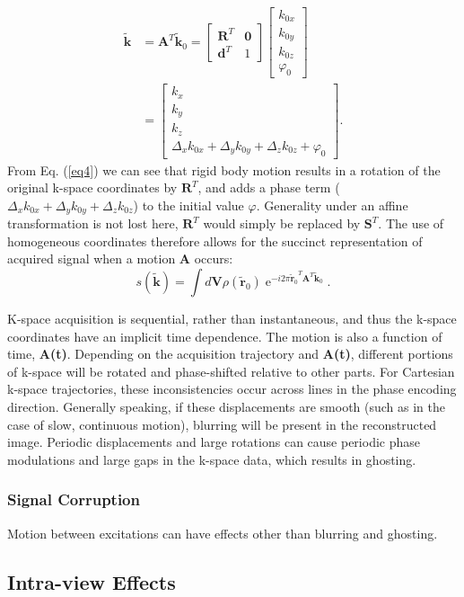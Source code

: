 \documentclass[class=article, crop=false]{standalone}
\begin{document}
\begin{equation} \label{eq4}
	\begin{split}
		\tilde{\textbf{k}} & = \textbf{A}^T\tilde{\textbf{k}}_0
		= \begin{bmatrix}\textbf{R}^T & \textbf{0} \\ \textbf{d}^T & 1\end{bmatrix}\begin{bmatrix}k_{0x}\\k_{0y}\\k_{0z}\\\varphi_0\end{bmatrix}\\
		& = \begin{bmatrix}k_{x}\\k_{y}\\k_{z}\\\Delta_{x}k_{0x} + \Delta_{y}k_{0y} + \Delta_{z}k_{0z} + \varphi_0\end{bmatrix}.
	\end{split}
\end{equation}
From Eq. (\ref{eq4}) we can see that rigid body motion results in a rotation of the original k-space coordinates by $\textbf{R}^T$, and adds a phase term ($\Delta_{x}k_{0x} + \Delta_{y}k_{0y} + \Delta_{z}k_{0z}$) to the initial value $\varphi$. Generality under an affine transformation is not lost here, $\textbf{R}^T$ would simply be replaced by $\textbf{S}^T$. The use of homogeneous coordinates therefore allows for the succinct representation of acquired signal when a motion \textbf{A} occurs:
\begin{equation} \label{eq5}
s(\tilde{\textbf{k}}) = \int d\textbf{V} \rho\left(\tilde{\textbf{r}}_0\right)\operatorname{e}^{-i2\pi{\tilde{\textbf{r}}_0}^{T}\textbf{A}^T\tilde{\textbf{k}}_0}.
\end{equation}
\par
K-space acquisition is sequential, rather than instantaneous, and thus the k-space coordinates have an implicit time dependence. The motion is also a function of time, \textbf{A(t)}. Depending on the acquisition trajectory and \textbf{A(t)}, different portions of k-space will be rotated and phase-shifted relative to other parts. For Cartesian k-space trajectories, these inconsistencies occur across lines in the phase encoding direction. Generally speaking, if these displacements are smooth (such as in the case of slow, continuous motion), blurring will be present in the reconstructed image. Periodic displacements and large rotations can cause periodic phase modulations and large gaps in the k-space data, which results in ghosting.

\subsubsection*{Signal Corruption}
Motion between excitations can have effects other than blurring and ghosting.


\subsection{Intra-view Effects}
\end{document}
